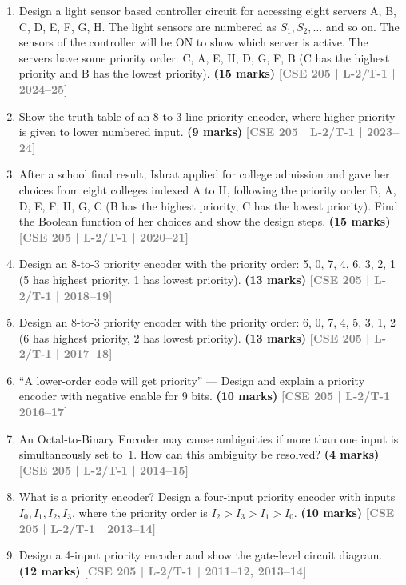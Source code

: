 \documentclass[12pt]{article}
\newcommand{\yr}[1]{\hfill\textcolor{gray}{\small\textbf{[#1]}}}
\newcommand{\mk}[1]{\textcolor{orange!70!black}{\small\textbf{(#1 marks)}}}
\begin{document}
\begin{enumerate}


\item Design a light sensor based controller circuit for accessing eight servers A, B, C, D, E, F, G, H. The light sensors are numbered as $S_1, S_2, \ldots$ and so on. The sensors of the controller will be ON to show which server is active. The servers have some priority order: C, A, E, H, D, G, F, B (C has the highest priority and B has the lowest priority).
\mk{15} \yr{CSE 205 | L-2/T-1 | 2024--25}

\item Show the truth table of an 8-to-3 line priority encoder, where higher priority is given to lower numbered input.
\mk{9} \yr{CSE 205 | L-2/T-1 | 2023--24}

\item After a school final result, Ishrat applied for college admission and gave her choices from eight colleges indexed A to H, following the priority order B, A, D, E, F, H, G, C (B has the highest priority, C has the lowest priority). Find the Boolean function of her choices and show the design steps.
\mk{15} \yr{CSE 205 | L-2/T-1 | 2020--21}

\item Design an 8-to-3 priority encoder with the priority order: 5, 0, 7, 4, 6, 3, 2, 1 (5 has highest priority, 1 has lowest priority).
\mk{13} \yr{CSE 205 | L-2/T-1 | 2018--19}

\item Design an 8-to-3 priority encoder with the priority order: 6, 0, 7, 4, 5, 3, 1, 2 (6 has highest priority, 2 has lowest priority).
\mk{13} \yr{CSE 205 | L-2/T-1 | 2017--18}

\item ``A lower-order code will get priority'' --- Design and explain a priority encoder with negative enable for 9 bits.
\mk{10} \yr{CSE 205 | L-2/T-1 | 2016--17}

\item An Octal-to-Binary Encoder may cause ambiguities if more than one input is simultaneously set to~1. How can this ambiguity be resolved?
\mk{4} \yr{CSE 205 | L-2/T-1 | 2014--15}

\item What is a priority encoder? Design a four-input priority encoder with inputs $I_0, I_1, I_2, I_3$, where the priority order is $I_2 > I_3 > I_1 > I_0$.
\mk{10} \yr{CSE 205 | L-2/T-1 | 2013--14}

\item Design a 4-input priority encoder and show the gate-level circuit diagram.
\mk{12} \yr{CSE 205 | L-2/T-1 | 2011--12, 2013--14}

\end{enumerate}
\end{document}
